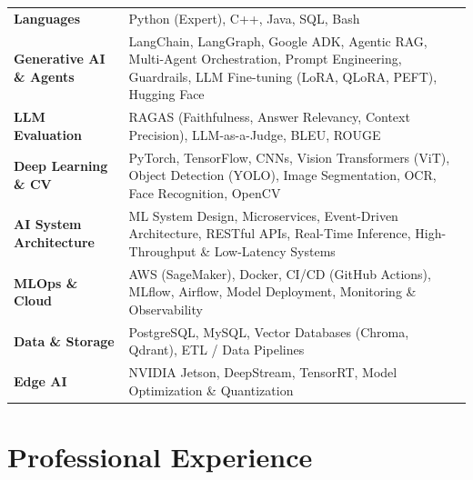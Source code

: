 \documentclass[10pt,a4paper]{article}
\begin{document}
\setlength{\tabcolsep}{6pt}
\small
\begin{tabularx}{\textwidth}{@{}l>{\raggedright\arraybackslash}X@{}}
\textbf{Languages}              & Python (Expert), C++, Java, SQL, Bash \\
\textbf{Generative AI \& Agents}& LangChain, LangGraph, Google ADK, Agentic RAG, Multi-Agent Orchestration, Prompt Engineering, Guardrails, LLM Fine-tuning (LoRA, QLoRA, PEFT), Hugging Face \\
\textbf{LLM Evaluation}         & RAGAS (Faithfulness, Answer Relevancy, Context Precision), LLM-as-a-Judge, BLEU, ROUGE \\
\textbf{Deep Learning \& CV}    & PyTorch, TensorFlow, CNNs, Vision Transformers (ViT), Object Detection (YOLO), Image Segmentation, OCR, Face Recognition, OpenCV \\
\textbf{AI System Architecture} & ML System Design, Microservices, Event-Driven Architecture, RESTful APIs, Real-Time Inference, High-Throughput \& Low-Latency Systems \\
\textbf{MLOps \& Cloud}         & AWS (SageMaker), Docker, CI/CD (GitHub Actions), MLflow, Airflow, Model Deployment, Monitoring \& Observability \\
\textbf{Data \& Storage}        & PostgreSQL, MySQL, Vector Databases (Chroma, Qdrant), ETL / Data Pipelines \\
\textbf{Edge AI}                & NVIDIA Jetson, DeepStream, TensorRT, Model Optimization \& Quantization \\
\end{tabularx}
\normalsize

\section{Professional Experience}
\end{document}

